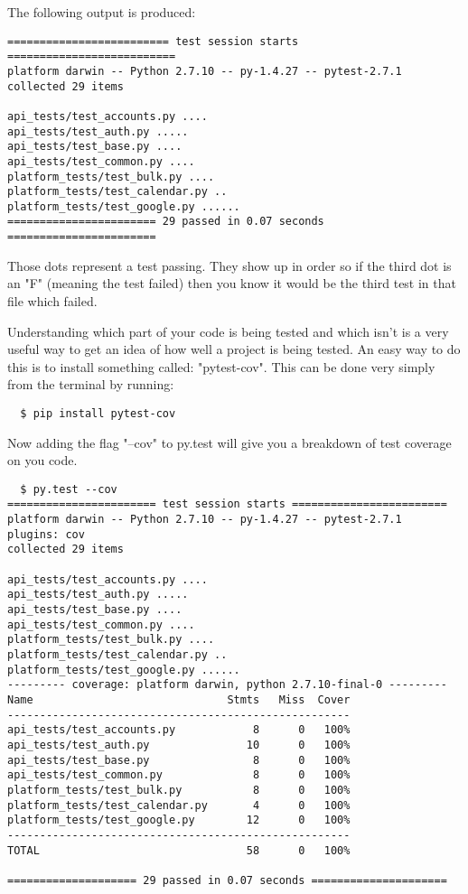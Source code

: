 The following output is produced:

\begin{lstlisting}
========================= test session starts ==========================
platform darwin -- Python 2.7.10 -- py-1.4.27 -- pytest-2.7.1
collected 29 items

api_tests/test_accounts.py ....
api_tests/test_auth.py .....
api_tests/test_base.py ....
api_tests/test_common.py ....
platform_tests/test_bulk.py ....
platform_tests/test_calendar.py ..
platform_tests/test_google.py ......
======================= 29 passed in 0.07 seconds =======================
\end{lstlisting}
\begin{info}
Those dots represent a test passing. They show up in order so if the third dot is an "F" (meaning the test failed) then you know it would be the third test in that file which failed.
\end{info}

Understanding which part of your code is being tested and which isn't is a very useful way to get an idea of how well a project is being tested.
An easy way to do this is to install something called: "pytest-cov". This can be done very simply from the terminal by running:
\begin{lstlisting}
  $ pip install pytest-cov
\end{lstlisting}
Now adding the flag "--cov" to py.test will give you a breakdown of test coverage on you code.
\begin{lstlisting}
  $ py.test --cov
======================= test session starts ========================
platform darwin -- Python 2.7.10 -- py-1.4.27 -- pytest-2.7.1
plugins: cov
collected 29 items

api_tests/test_accounts.py ....
api_tests/test_auth.py .....
api_tests/test_base.py ....
api_tests/test_common.py ....
platform_tests/test_bulk.py ....
platform_tests/test_calendar.py ..
platform_tests/test_google.py ......
--------- coverage: platform darwin, python 2.7.10-final-0 ---------
Name                              Stmts   Miss  Cover
-----------------------------------------------------
api_tests/test_accounts.py            8      0   100%
api_tests/test_auth.py               10      0   100%
api_tests/test_base.py                8      0   100%
api_tests/test_common.py              8      0   100%
platform_tests/test_bulk.py           8      0   100%
platform_tests/test_calendar.py       4      0   100%
platform_tests/test_google.py        12      0   100%
-----------------------------------------------------
TOTAL                                58      0   100%

==================== 29 passed in 0.07 seconds =====================
\end{lstlisting}

